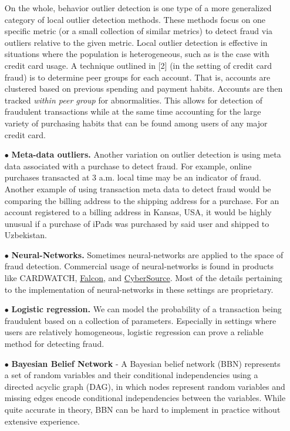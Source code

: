 \documentclass[12pt]{article}
\begin{document}
\begin{itemize}
On the whole, behavior outlier detection is one type of a more generalized category of local outlier detection methods. These methods focus on one specific metric (or a small collection of similar metrics) to detect fraud via outliers relative to the given metric. Local outlier detection is effective
in situations where the population is heterogeneous, such as is the case with credit card usage. A technique outlined in [2] (in the setting of credit card fraud) is to determine peer groups for each account. That is, accounts are clustered based on previous spending and payment habits. Accounts are then tracked \textit{within peer group} for abnormalities.   This allows for detection of fraudulent transactions while at the same time accounting for the large variety of purchasing habits that can be found among users of any major credit card. 

\item[$\bullet$]\textbf{Meta-data outliers.} Another variation on outlier detection is using meta data associated with a purchase to detect fraud. For example, online purchases transacted at 3 a.m. local time may be an indicator of fraud. Another example of using transaction meta data to detect fraud would be comparing the billing address to the shipping address for a purchase. For an account registered to a billing address in Kansas, USA, it would be highly unusual if a purchase of iPads was purchased by said user and shipped to Uzbekistan.  


\item[$\bullet$] \textbf{Neural-Networks.} Sometimes neural-networks are applied to the space of fraud detection. Commercial usage of neural-networks is found in products like CARDWATCH, \href{http://www.fico.com/en/products/fico-falcon-fraud-manager#overview}{Falcon}, and \href{https://www.cybersource.com/products/fraud_management/}{CyberSource}. Most of the details pertaining to the implementation of neural-networks in these settings are proprietary. 

\item[$\bullet$] \textbf{Logistic regression.} We can model the probability of a transaction being fraudulent based on a collection of parameters. Especially in settings where users are relatively homogeneous, logistic regression can prove a reliable method for detecting fraud. 

\item[$\bullet$] \textbf{Bayesian Belief Network} - A Bayesian belief network (BBN) represents a set of random variables and their conditional independencies using a directed acyclic graph (DAG), in which nodes represent random variables and missing edges encode conditional independencies between the variables. While quite accurate in theory, BBN can be hard to implement in practice without extensive experience. 
\end{itemize}
\end{document}
